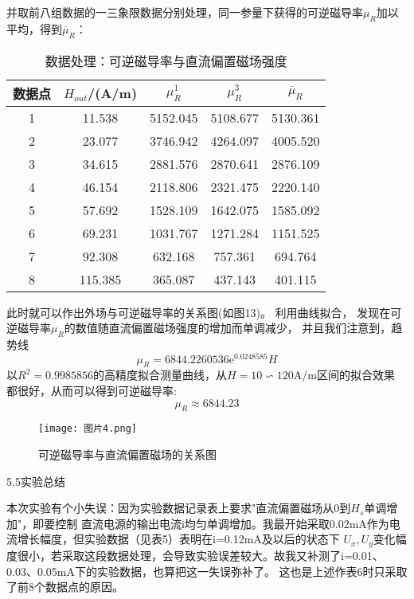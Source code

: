 \documentclass[11pt]{article}
\begin{document}
并取前八组数据的一三象限数据分别处理，同一参量下获得的可逆磁导率$\mu_R$加以平均，得到$\overline \mu_R$：
\begin{table}[H]
    \centering
    \begin{tabular}{ccccc}
        \toprule
        数据点&$H_{out}$/(A/m) & $\mu^1_{R}$ & $\mu_{R}^3$ & $\overline \mu_R$ \\ \midrule
        1&11.538  & 5152.045  & 5108.677  & 5130.361  \\ 
        2&23.077  & 3746.942  & 4264.097  & 4005.520  \\ 
        3&34.615  & 2881.576  & 2870.641  & 2876.109  \\ 
        4&46.154  & 2118.806  & 2321.475  & 2220.140  \\ 
        5&57.692  & 1528.109  & 1642.075  & 1585.092  \\ 
        6&69.231  & 1031.767  & 1271.284  & 1151.525  \\ 
        7&92.308  & 632.168  & 757.361  & 694.764  \\ 
        8&115.385  & 365.087  & 437.143  & 401.115 \\ 
        \bottomrule
    \end{tabular}
    \caption{数据处理：可逆磁导率与直流偏置磁场强度}
\end{table}

此时就可以作出外场与可逆磁导率的关系图(如图13)。
利用曲线拟合，
发现在可逆磁导率$\mu_R$的数值随直流偏置磁场强度的增加而单调减少，
并且我们注意到，趋势线\[
    \mu_R=6844.2260536\mathrm e^{0.0248585}H
\]
以$R^2=0.9985856$的高精度拟合测量曲线，从$H=10\backsim 120$A/m区间的拟合效果
都很好，从而可以得到可逆磁导率:$$\mu_R\approx 6844.23$$

\begin{figure}[H]
    \centering
    \texttt{[image: 图片4.png]}
    \caption{可逆磁导率与直流偏置磁场的关系图}
\end{figure}

\begin{center}
    \large{5.5实验总结}
\end{center}

本次实验有个小失误：因为实验数据记录表上要求"直流偏置磁场从0到$H_s$单调增加"，即要控制
直流电源的输出电流i均匀单调增加。我最开始采取0.02mA作为电流增长幅度，但实验数据（见表5）表明在i=0.12mA及以后的状态下
$U_x,U_y$变化幅度很小，若采取这段数据处理，会导致实验误差较大。故我又补测了i=0.01、0.03、0.05mA下的实验数据，也算把这一失误弥补了。
这也是上述作表6时只采取了前8个数据点的原因。
\end{document}
